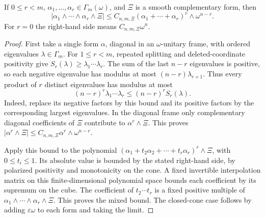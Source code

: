 \begin{lemma}\label{draft:605-absolute-mixed-forms}
If $0\leq r<m$, $\alpha_1,\ldots,\alpha_r\in\Gamma_m(\omega)$,
and $\Xi$ is a smooth complementary form, then
\[
 |\alpha_1\wedge\cdots\wedge\alpha_r\wedge\Xi|
 \leq C_{n,m,\Xi}(\alpha_1+\cdots+\alpha_r)^r\wedge\omega^{n-r}.
\]
For $r=0$ the right-hand side means $C_{n,m,\Xi}\omega^n$.
\end{lemma}
\begin{proof}
First take a single form $\alpha$, diagonal in an $\omega$-unitary frame,
with ordered eigenvalues $\lambda\in\Gamma_m$.
For $1\leq r<m$, repeated splitting and deleted-coordinate positivity
give $S_r(\lambda)\geq\lambda_1\cdots\lambda_r$.
The sum of the last $n-r$ eigenvalues is positive, so each negative
eigenvalue has modulus at most $(n-r)\lambda_{r+1}$.
Thus every product of $r$ distinct eigenvalues has modulus at most
\[
 (n-r)^r\lambda_1\cdots\lambda_r\leq(n-r)^r S_r(\lambda).
\]
Indeed, replace its negative factors by this bound and its positive
factors by the corresponding largest eigenvalues. In the diagonal frame
only complementary diagonal coefficients of $\Xi$ contribute to
$\alpha^r\wedge\Xi$. This proves
$|\alpha^r\wedge\Xi|\leq C_{n,m,\Xi}\alpha^r\wedge\omega^{n-r}$.

Apply this bound to the polynomial
$(\alpha_1+t_2\alpha_2+\cdots+t_r\alpha_r)^r\wedge\Xi$,
with $0\leq t_i\leq1$. Its absolute value is bounded by the stated
right-hand side, by polarized positivity and monotonicity on the cone.
A fixed invertible interpolation matrix on this finite-dimensional
polynomial space bounds each coefficient by its supremum on the cube.
The coefficient of $t_2\cdots t_r$ is a fixed positive multiple of
$\alpha_1\wedge\cdots\wedge\alpha_r\wedge\Xi$.
This proves the mixed bound. The closed-cone case follows by adding
$\varepsilon\omega$ to each form and taking the limit.
\end{proof}

